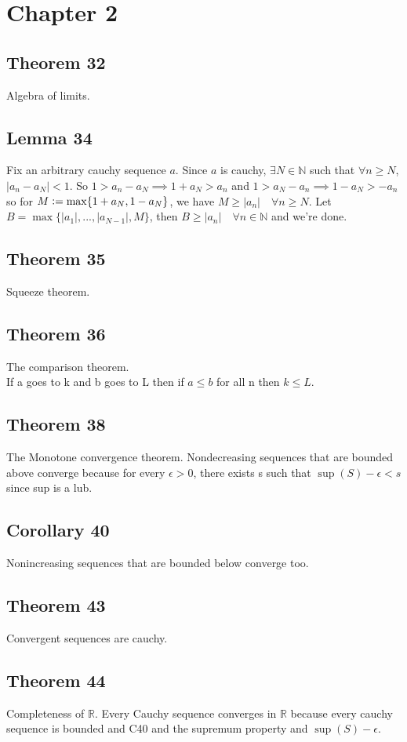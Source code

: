 \documentclass{article}
\begin{document}
\newpage{}
\section*{Chapter 2}
\subsection{Theorem 32}
Algebra of limits.
\subsection{Lemma 34}
Fix an arbitrary cauchy sequence $a$. Since $a$ is cauchy,
$\exists N \in \mathbb{N}$ such that $\forall n \geq N$, $|a_n-a_N|<1$.
So $1>a_n-a_N \implies 1+a_N>a_n$ and
$1>a_N-a_n \implies 1-a_N>-a_n$ so for
$M \vcentcolon= \max \{ 1+a_N, 1-a_N \}$,
we have $M \geq |a_n| \quad \forall n \geq N$.
Let $B = \max \{|a_1|,...,|a_{N-1}|,M  \}$, then $B \geq |a_n| \quad \forall n \in \mathbb{N}$ and we're done.
\subsection{Theorem 35}
Squeeze theorem.
\subsection{Theorem 36}
The comparison theorem. \\
\newline
If a goes to k and b goes to L then if $a \leq b$ for all n then $k \leq L$.
\subsection{Theorem 38}
The Monotone convergence theorem.
Nondecreasing sequences that are bounded above converge because for every
$\epsilon > 0$, there exists s such that $\sup(S)-\epsilon<s$ since sup is a lub.
\subsection{Corollary 40}
Nonincreasing sequences that are bounded below converge too.
\subsection{Theorem 43}
Convergent sequences are cauchy.
\subsection{Theorem 44}
Completeness of $\mathbb{R}$. Every Cauchy sequence converges in $\mathbb{R}$ because
every cauchy sequence is bounded and C40 and the supremum property and $\sup(S)-\epsilon$.
\end{document}

